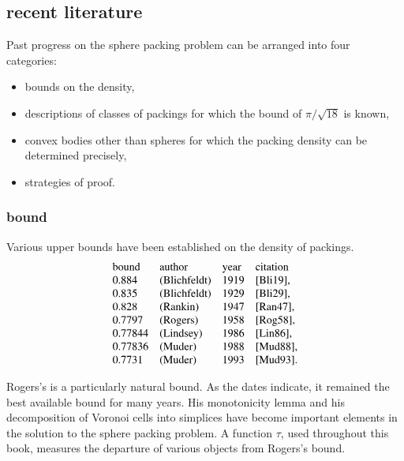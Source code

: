 \subsection{recent literature}

Past progress on the sphere packing problem can be arranged into
four categories:
\begin{itemize}
    \item bounds on the density,
    \item descriptions of classes of packings for
which the bound of $\pi/\sqrt{18}$ is known,
    \item convex bodies other
than spheres for which the packing density can be determined
precisely,
    \item strategies of proof.
\end{itemize}

\subsubsection{bound}

Various upper bounds have been established on the density of
packings.
$$
\begin{array}{llll}
\text{bound} & \text{author} & \text{year} & \text{citation} \\
  0.884 &   \text{(Blichfeldt)} & 1919 & \text{\cite{Bli19}},\\
  0.835 &   \text{(Blichfeldt)} & 1929 & \text{\cite{Bli29}},\\
  0.828 &   \text{(Rankin)} & 1947 & \text{\cite{Ran47}},\\
  0.7797 &  \text{(Rogers)} & 1958 & \text{\cite{Rog58}},\\
  0.77844 &  \text{(Lindsey)} & 1986 & \text{\cite{Lin86}},\\
  0.77836 &  \text{(Muder)} & 1988 & \text{\cite{Mud88}},\\
  0.7731 &  \text{(Muder)} & 1993 & \text{\cite{Mud93}}.\\
\end{array}
$$


\smallskip
Rogers's is a particularly natural bound.
  As the dates indicate, it remained the best available
bound for many years.  His monotonicity lemma and his
decomposition of Voronoi cells into simplices have become important
elements in the solution to the sphere packing problem.
A function $\tau$,
used throughout this
book, measures the departure of various objects from
Rogers's bound.

